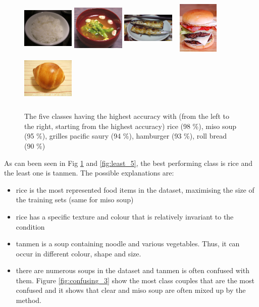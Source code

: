 \begin{figure}
    \centering
    \includegraphics[height=2.5cm, width=2.5cm]{img/top_rice.jpg}
    \includegraphics[height=2.5cm, width=2.5cm]{img/top_miso_soup.jpg}
    \includegraphics[height=2.5cm, width=2.5cm]{img/top_grilled_pacific_saury.jpg}
    \includegraphics[height=2.5cm, width=2.5cm]{img/top_hamburger.jpg}
    \includegraphics[height=2.5cm, width=2.5cm]{img/top_roll_bread.jpg}
    \caption[Classes having the highest accuracy]{The five classes having the highest accuracy with (from the left to the right, starting from the highest accuracy) rice (98 \%), miso soup (95 \%), grilles pacific saury (94 \%), hamburger (93 \%), roll bread (90 \%)}
    \label{fig:top_5}
\end{figure}

As can been seen in Fig \ref{fig:top_5} and \ref{fig:least_5}, the best performing class is rice and the least one is tanmen. The possible explanations are:
\begin{itemize}
    \item rice is the most represented food items in the dataset, maximising the size of the training sets (same for miso soup)
    \item rice has a specific texture and colour that is relatively invariant to the condition
    \item tanmen is a soup containing noodle and various vegetables. Thus, it can occur in different colour, shape and size.
    \item there are numerous soups in the dataset and tanmen is often confused with them. Figure \ref{fig:confusing_3} show the most class couples that are the most confused and it shows that clear  and miso soup are often mixed up by the method.
\end{itemize}

